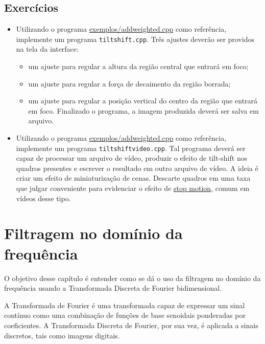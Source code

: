 \documentclass[11pt]{amsbook}
\begin{document}
\hypertarget{x-exercícios}{\section{Exercícios}}
\begin{itemize}

\item Utilizando o programa \href{exemplos/addweighted.cpp}{exemplos/addweighted.cpp} como referência,
implemente um programa \texttt{tiltshift.cpp}. Três ajustes deverão ser
providos na tela da interface:

\begin{itemize}

\item um ajuste para regular a altura da região central que entrará em foco;

\item um ajuste para regular a força de decaimento da região borrada;

\item um ajuste para regular a posição vertical do centro da região que
 entrará em foco.
Finalizado o programa, a imagem produzida deverá ser salva em
 arquivo.

\end{itemize}

\item Utilizando o programa \href{exemplos/addweighted.cpp}{exemplos/addweighted.cpp} como referência,
implemente um programa \texttt{tiltshiftvideo.cpp}. Tal programa deverá ser
capaz de processar um arquivo de vídeo, produzir o efeito de
tilt-shift nos quadros presentes e escrever o resultado em outro
arquivo de vídeo. A ideia é criar um efeito de miniaturização de
cenas. Descarte quadros em uma taxa que julgar conveniente para
evidenciar o efeito de
\href{https://pt.wikipedia.org/wiki/Stop_motion}{stop motion}, comum
em vídeos desse tipo.

\end{itemize}


\hypertarget{x-filtragem-no-domínio-da-frequência}{\chapter{Filtragem no domínio da frequência}}
O objetivo desse capítulo é entender como se dá o uso da filtragem no
domínio da frequência usando a Transformada Discreta de Fourier
bidimensional.


A Transformada de Fourier é uma transformada capaz de expressar um
sinal contínuo como uma combinação de funções de base senoidais
ponderadas por coeficientes. A Transformada Discreta de Fourier, por
sua vez, é aplicada a sinais discretos, tais como imagens digitais.
\end{document}
